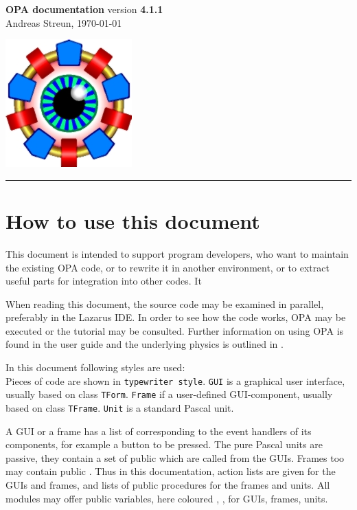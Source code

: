 \documentclass[12pt]{article}
\newcommand\code[1]{{\tt #1}}
\newcommand\guico[1]{{\color{blue}\code{#1}}}
\newcommand\guifco[1]{{\color{violet}\code{#1}}}
\newcommand{\unico}[1]{{\color{burntorange}\code{#1}}}
\newcommand{\opagui}[1]{\colorbox{blue!20}{\code{#1}}}
\newcommand{\opaguif}[1]{\colorbox{violet!30}{\code{#1}}}
\newcommand{\opauni}[1]{\colorbox{orange!30}{\code{#1}}}
\begin{document}
\noindent
{}

\parbox[t]{0.7\hsize}{
  {\Huge\bf OPA documentation} version {\bf 4.1.1}\\
  Andreas Streun, \today
} \hfill  \includegraphics{opalogo_small.jpg}
\rule{\hsize}{1pt}

\section{How to use this document}
This document is intended to support program developers, who want to maintain the existing OPA code, or to rewrite it in another environment, or to extract useful parts for integration into other codes. It

When reading this document, the source code may be examined in parallel, preferably in the Lazarus IDE. In order to see how the code works, OPA may be executed or the tutorial \cite{tutorial} may be consulted. Further information on using OPA is found in the user guide \cite{userguide} and the underlying physics is outlined in \cite{inside}.

In this document following styles are used:\\
Pieces of code are shown in \code{typewriter style}.
\opagui{GUI} is a graphical user interface, usually based on class \code{TForm}. \opaguif{Frame} if a user-defined GUI-component, usually based on class \code{TFrame}.  \opauni{Unit} is a standard Pascal unit. 

A GUI or a frame has a list of \guico{actions} corresponding to the event handlers of its components, for example a button to be pressed. The pure Pascal units are passive, they contain a set of public \unico{procedures} which are called from the GUIs. Frames too may contain public \guifco{procedures}. Thus in this documentation, action lists are given for the GUIs and frames, and lists of public procedures for the frames and units. All modules may offer public variables, here coloured \guico{x}, \guifco{y}, \unico{z} for GUIs, frames, units.
\end{document}
